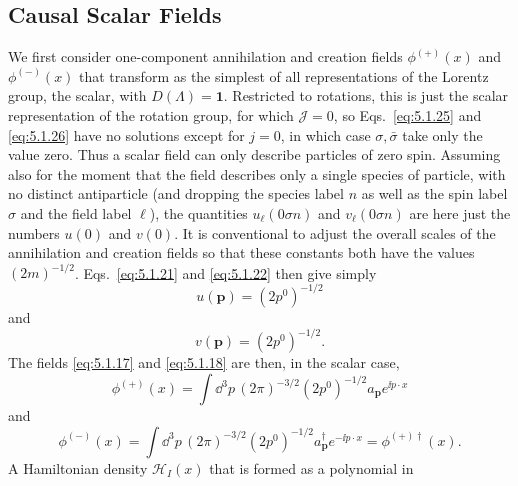 
\subsection{Causal Scalar Fields}

We first consider one-component annihilation and creation fields
$\phi^{(+)}(x)$ and $\phi^{(-)}(x)$ that transform as the simplest of all
representations of the Lorentz group, the scalar, with
$D(\Lambda)=\mathbf{1}$. Restricted to rotations, this is just the scalar
representation of the rotation group, for which $\boldsymbol{\mathcal{J}}=0$,
so Eqs.~\eqref{eq:5.1.25} and \eqref{eq:5.1.26} have no solutions except for $j=0$, in which
case $\sigma,\bar\sigma$ take only the value zero. Thus a scalar field can only
describe particles of zero spin. Assuming also for the moment that the field
describes only a single species of particle, with no distinct antiparticle
(and dropping the species label $n$ as well as the spin label $\sigma$ and the
field label $\ell$), the quantities $u_\ell(0\sigma n)$ and $v_\ell(0\sigma n)$
are here just the numbers $u(0)$ and $v(0)$. It is conventional to adjust the
overall scales of the annihilation and creation fields so that these constants
both have the values $(2m)^{-1/2}$. Eqs.~\eqref{eq:5.1.21} and \eqref{eq:5.1.22} then give simply
\begin{equation}
  u(\mathbf{p})=(2p^0)^{-1/2}
  \tag{5.2.1}\label{eq:5.2.1}
\end{equation}
and
\begin{equation}
  v(\mathbf{p})=(2p^0)^{-1/2}.
  \tag{5.2.2}\label{eq:5.2.2}
\end{equation}
The fields \eqref{eq:5.1.17} and \eqref{eq:5.1.18} are then, in the scalar case,
\begin{equation}
  \phi^{(+)}(x)=\int \dd^3p\,(2\pi)^{-3/2}(2p^0)^{-1/2}
  a_{\mathbf{p}}e^{\ii p\cdot x}
  \tag{5.2.3}\label{eq:5.2.3}
\end{equation}
and
\begin{equation}
  \phi^{(-)}(x)=\int \dd^3p\,(2\pi)^{-3/2}(2p^0)^{-1/2}
  a^\dagger_{\mathbf{p}}e^{-\ii p\cdot x}=\phi^{(+)\dagger}(x).
  \tag{5.2.4}\label{eq:5.2.4}
\end{equation}
A Hamiltonian density $\mathcal{H}_I(x)$ that is formed as a polynomial in

